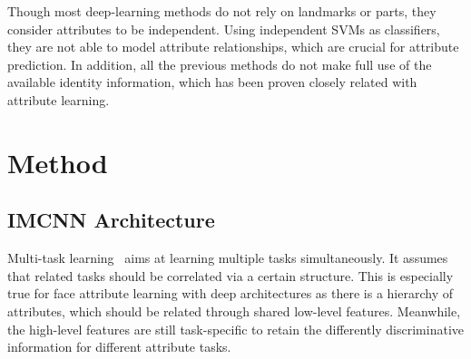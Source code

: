\documentclass[wcp]{jmlr}
\begin{document}
	Though most deep-learning methods do not rely on landmarks or parts, they consider attributes to be independent. Using independent SVMs as classifiers, they are not able to model attribute relationships, which are crucial for attribute prediction. In addition, all the previous methods do not make full use of the available identity information, which has been proven closely related with attribute learning.
	
	\section{Method}
	\subsection{IMCNN Architecture}
	Multi-task learning~\cite{multi1,multi2,multi3,multi4,multi5} aims at learning multiple tasks simultaneously. It assumes that related tasks should be correlated via a certain structure. This is especially true for face attribute learning with deep architectures as there is a hierarchy of attributes, which should be related through shared low-level features. Meanwhile, the high-level features are still task-specific to retain the differently discriminative information for different attribute tasks.
	
\end{document}
